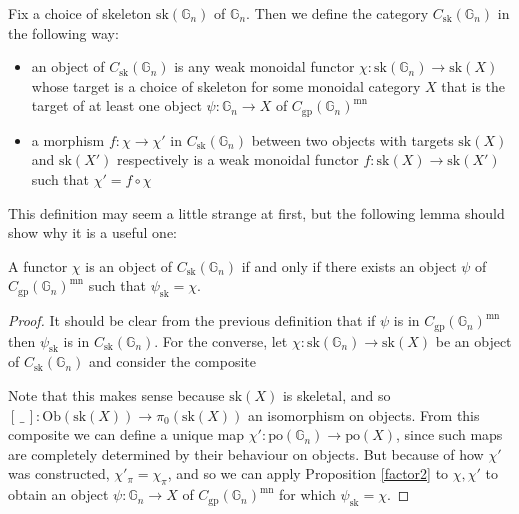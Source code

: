 \documentclass{amsart} %
\newenvironment{eq*}{\begin{equation*}}{\end{equation*}}
\begin{document}
\begin{defi} Fix a choice of skeleton $\mathrm{sk}(\mathbb{G}_n)$ of $\mathbb{G}_n$. Then we define the category $C_{\mathrm{sk}}(\mathbb{G}_n)$ in the following way:
\begin{itemize}
\item an object of $C_{\mathrm{sk}}(\mathbb{G}_n)$ is any weak monoidal functor $\chi: \mathrm{sk}(\mathbb{G}_n) \to \mathrm{sk}(X)$ whose target is a choice of skeleton for some monoidal category $X$ that is the target of at least one object $\psi: \mathbb{G}_n \to X$ of $C_{\mathrm{gp}}(\mathbb{G}_n)^{\mathrm{mn}}$
\item a morphism $f: \chi \to \chi'$ in $C_{\mathrm{sk}}(\mathbb{G}_n)$ between two objects with targets $\mathrm{sk}(X)$ and $\mathrm{sk}(X')$ respectively is a weak monoidal functor $f: \mathrm{sk}(X) \to \mathrm{sk}(X')$ such that $\chi' = f \circ \chi$
\end{itemize}
\end{defi}

This definition may seem a little strange at first, but the following lemma should show why it is a useful one:

\begin{lem}\label{Csklem} A functor $\chi$ is an object of $C_{\mathrm{sk}}(\mathbb{G}_n)$ if and only if there exists an object $\psi$ of $C_{\mathrm{gp}}(\mathbb{G}_n)^{\mathrm{mn}}$ such that $\psi_{\mathrm{sk}} = \chi$.
\end{lem}
\begin{proof}
It should be clear from the previous definition that if $\psi$ is in $C_{\mathrm{gp}}(\mathbb{G}_n)^{\mathrm{mn}}$ then $\psi_{\mathrm{sk}}$ is in $C_{\mathrm{sk}}(\mathbb{G}_n)$. For the converse, let $\chi: \mathrm{sk}(\mathbb{G}_n) \to \mathrm{sk}(X)$ be an object of $C_{\mathrm{sk}}(\mathbb{G}_n)$ and consider the composite
\begin{eq*}  \end{eq*}
Note that this makes sense because $\mathrm{sk}(X)$ is skeletal, and so $[ \, \_ \, ] : \mathrm{Ob}(\mathrm{sk}(X)) \to \pi_0(\mathrm{sk}(X))$ an isomorphism on objects. From this composite we can define a unique map $\chi': \mathrm{po}(\mathbb{G}_n) \to \mathrm{po}(X)$, since such maps are completely determined by their behaviour on objects. But because of how $\chi'$ was constructed, $\chi'_{\pi} = \chi_{\pi}$, and so we can apply Proposition \ref{factor2} to $\chi, \chi'$ to obtain an object $\psi : \mathbb{G}_n \to X$ of $C_{\mathrm{gp}}(\mathbb{G}_n)^{\mathrm{mn}}$ for which $\psi_{\mathrm{sk}} = \chi$.
\end{proof}
\end{document}
